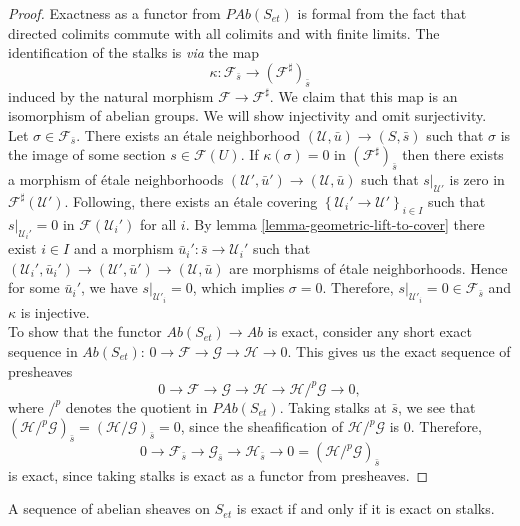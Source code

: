 \begin{proof}
Exactness as a functor from $\textit{PAb}(S_{et})$ is formal from the fact that
directed colimits commute with all colimits and with finite limits. The
identification of the stalks is {\it via} the map
$$
\kappa : \mathcal{F}_{\bar s}\longrightarrow
\left(\mathcal{F}^\sharp\right)_{\bar s}
$$
induced by the natural morphism $\mathcal{F}\to \mathcal{F}^\sharp$. We claim
that this map is an isomorphism of abelian groups. We will show injectivity
and omit surjectivity.
\\
Let $\sigma\in \mathcal{F}_{\bar s}$. There exists an \'etale neighborhood
$(\mathcal{U}, \bar u)\to (S, \bar s)$ such that $\sigma$ is the image of some
section $s \in \mathcal{F}(U)$. If $\kappa(\sigma) = 0$ in
$(\mathcal{F}^\sharp)_{\bar s}$ then there exists a morphism of \'etale
neighborhoods $(\mathcal{U}', \bar u')\to (\mathcal{U}, \bar u)$ such that
$s|_{\mathcal{U}'}$ is zero in $\mathcal{F}^\sharp(\mathcal{U}')$. Following,
there exists an \'etale covering $\left\{\mathcal{U}_i'\to
\mathcal{U}'\right\}_{i\in I}$ such that $s|_{\mathcal{U}_i'}=0$ in
$\mathcal{F}(\mathcal{U}_i')$ for all $i$. By lemma
\ref{lemma-geometric-lift-to-cover} there exist $i \in I$ and a morphism $\bar
u_i': \bar s \to \mathcal{U}_i'$ such that $(\mathcal{U}_i', \bar u_i')\to
(\mathcal{U}', \bar u')\to (\mathcal{U}, \bar u)$ are morphisms of \'etale
neighborhoods. Hence for some $\bar u_i'$, we have $s|_{\mathcal{U}'_i}=0$,
which implies $\sigma = 0$. Therefore, $s|_{\mathcal{U}'_i} = 0 \in
\mathcal{F}_{\bar s}$ and $\kappa$ is injective.
\\
To show that the functor $\textit{Ab}(S_{et}) \to \textit{Ab}$ is
exact, consider any short exact sequence in $\textit{Ab}(S_{et})$:
$
0\to \mathcal{F}\to \mathcal{G}\to \mathcal H \to 0.
$
This gives us the exact sequence of presheaves
$$
0 \to \mathcal{F}\to \mathcal{G} \to \mathcal H\to \mathcal H/^p\mathcal{G} \to
0,
$$
where $/^p$ denotes the quotient in $\textit{PAb}(S_{et})$. Taking stalks at
$\bar s$, we see that $(\mathcal H /^p\mathcal{G})_{\bar{s}} = (\mathcal H
/\mathcal{G})_{\bar{s}} = 0$, since the sheafification of $\mathcal
H/^p\mathcal{G}$ is $0$.
Therefore,
$$
0\to \mathcal{F}_{\bar s	} \to \mathcal{G}_{\bar s} \to
\mathcal{H}_{\bar s} \to 0 = (\mathcal H/^p\mathcal{G})_{\bar s}
$$
is exact, since taking stalks is exact as a functor from presheaves.
\end{proof}

\begin{theorem}
\label{theorem-exactness-stalks}
A sequence of abelian sheaves on
$S_{et}$ is exact if and only if it is exact on stalks.
\end{theorem}

